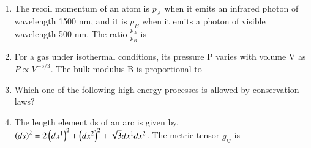 \documentclass[journal,12pt,onecolumn]{IEEEtran}
\theoremstyle{remark}
\begin{document}
\begin{enumerate}
\item The recoil momentum of an atom is $p_A$ when it emits an infrared photon of wavelength 1500 nm, and it is $p_B$ when it emits a photon of visible wavelength 500 nm. The ratio $\frac{p_A}{p_B}$ is
\hfill{} \begin{enumerate}  \end{enumerate}

\item For a gas under isothermal conditions, its pressure P varies with volume V as $P \propto V^{-5/3}$. The bulk modulus B is proportional to
\hfill{} \begin{enumerate}  \end{enumerate}

\item Which one of the following high energy processes is allowed by conservation laws?
\hfill{} \begin{enumerate}  \end{enumerate}

\item The length element ds of an arc is given by, $\left(ds\right)^2 = 2\left(dx^1\right)^2 + \left(dx^2\right)^2 + \sqrt{3}dx^1dx^2$. The metric tensor $g_{ij}$ is
\hfill{} \begin{enumerate}  \end{enumerate}


\end{enumerate}
\end{document}
